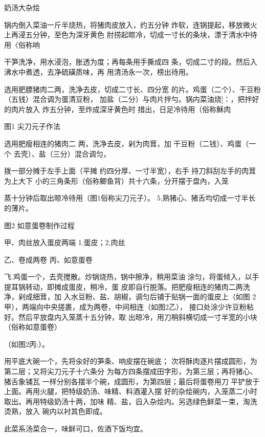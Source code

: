 \begin{recipe}{奶汤大杂烩}

\ingredients



\cooking

\step 锅内倒入菜油一斤半烧热，将猪肉皮放入，约五分钟 炸软，连锅提起，移放微火上再浸五分钟，至色为深牙黄色 肘捞起晾冷，切成一寸长的条块，漂于清水中待用〈俗称响

\step 

\step 干笋洗净，用水浸泡，胀透为度；再每条用手撕成四 条，切成二寸的段。然后入沸水中煮透，去净硫磺质味，再 用清汤永一次，榜出待用。

\step 选用肥膘猪肉二两，洗净去皮，切成二寸长、四分宽 的片。鸡蛋（二个）、干豆粉（五钱）混合调为蛋清豆粉， 加盐（二分）与肉片拌勻。锅内菜油烧]：，把拌好的肉片放入 炸五分钟，至炸成深牙黄色时 措出，日足冷待用（俗称穌肉

图1 尖刀元子作法

选用肥瘦相连的猪肉二 两，洗净去皮，剁为肉茸，加 干豆粉（二钱）、鸡蛋（一个 去壳）、盐（三分）混合调匀，

拨一部分摊于左手上面（平摊 约四分厚、一寸半宽），右手 持刀斜刮左手的肉茸为上大下 小的三角条形（俗称鲫鱼背）共十六条，分开摆于盘內，入笼

蒸十分钟后取出晾冷待用（图1俗称尖刀元子）。 5,熟猪心、猪舌均切成一寸半长的薄片。

图2 如意蛋卷制作过程

甲、肉丝放入蛋皮两端 1.蛋皮；2,肉丝

乙、卷成两卷 丙、如意蛋卷

飞.鸡蛋一个，去壳搅散。炒锅烧热，锅中擦净，稍用菜油 涂匀，将蛋倾入，以手提耳锅转动，即摊成蛋皮，稍冷，蛋 皮即自行脱落。把肥瘦相连的猪肉二两洗净，剁成细茸，加 入水豆粉、盐、胡椒，调匀后铺于贴锅一面的蛋皮上（如图 2甲），两端向中央搓裹，成为两卷，中间相连（如图2乙）， 接口处涂少许豆粉粘好。然后平放盘内入笼蒸十五分钟，取 出晾冷，用刀稍斜横切成一寸半宽的小块（俗称如意蛋卷）

（如图2丙:）。

\step 用平底大碗一个，先将汆好的笋条、响皮摆在碗底； 次将酥肉逐片摆成圆形，为第二层；又将尖刀元子十六条分 为每方四条摆成田字形，为第三层；再将猪心、猪舌象铺瓦 一样分别各摆半个碗，成圆形，为第四层；最后将蛋卷用刀 平铲放于上面。再用火腿，把特级奶汤、味精、料酒灌入摆 好的杂烩碗内，入笼蒸二小时取出。再用特级奶汤十两，加味 精、盐，舀入杂烩内。另选绿色鲜菜一束，淘洗烫熟，放入 碗内以衬其色即成。

\notes

此菜系汤菜合一，味鲜可口，佐酒下饭均宜。

\end{recipe}

